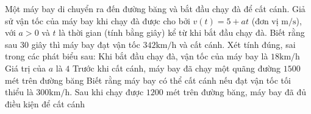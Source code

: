 \begin{ex}%
	Một máy bay di chuyển ra đến đường băng và bắt đầu chạy đà để cất cánh. Giả sử vận tốc của máy bay khi chạy đà được cho bởi $v(t) = 5 + at$ (đơn vị $\text{m/s}$), với $a > 0$ và $t$ là thời gian (tính bằng giây) kể từ khi bắt đầu chạy đà. Biết rằng sau $30$ giây thì máy bay đạt vận tốc $342\text{km/h}$ và cất cánh. Xét tính đúng, sai trong các phát biểu sau:
	\choiceTF
	{\True Khi bắt đầu chạy đà, vận tốc của máy bay là $18\text{km/h}$}
	{Giá trị của $a$ là $4$}
	{\True Trước khi cất cánh, máy bay đã chạy một quãng đường $1500$ mét trên đường băng}
	{\True Biết rằng máy bay có thể cất cánh nếu đạt vận tốc tối thiểu là $300\text{km/h}$. Sau khi chạy được $1200$ mét trên đường băng, máy bay đã đủ điều kiện để cất cánh}
\end{ex}

